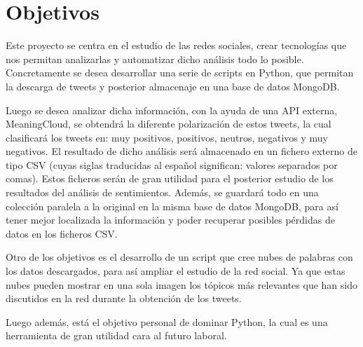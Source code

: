 
\chapter{Objetivos}

Este proyecto se centra en el estudio de las redes sociales, crear tecnologías que nos permitan analizarlas y automatizar dicho análisis todo lo posible. Concretamente se desea desarrollar una serie de scripts en Python, que permitan la descarga de tweets y posterior almacenaje en una base de datos MongoDB\cite{MongoDB}. 

Luego se desea analizar dicha información, con la ayuda de una API externa, MeaningCloud\cite{MeaningCloud}, se obtendrá la diferente polarización de estos tweets, la cual clasificará los tweets en: muy positivos, positivos, neutros, negativos y muy negativos. El resultado de dicho análisis será almacenado en un fichero externo de tipo CSV (cuyas siglas traducidas al español significan: valores separados por comas). Estos ficheros serán de gran utilidad para el posterior estudio de los resultados del análisis de sentimientos. Además, se guardará todo en una colección paralela a la original en la misma base de datos MongoDB, para así tener mejor localizada la información y poder recuperar posibles pérdidas de datos en los ficheros CSV. 

Otro de los objetivos es el desarrollo de un script que cree nubes de palabras con los datos descargados, para así ampliar el estudio de la red social. Ya que estas nubes pueden mostrar en una sola imagen los tópicos más relevantes que han sido discutidos en la red durante la obtención de los tweets. 

Luego además, está el objetivo personal de dominar Python, la cual es una herramienta de gran utilidad cara al futuro laboral. 